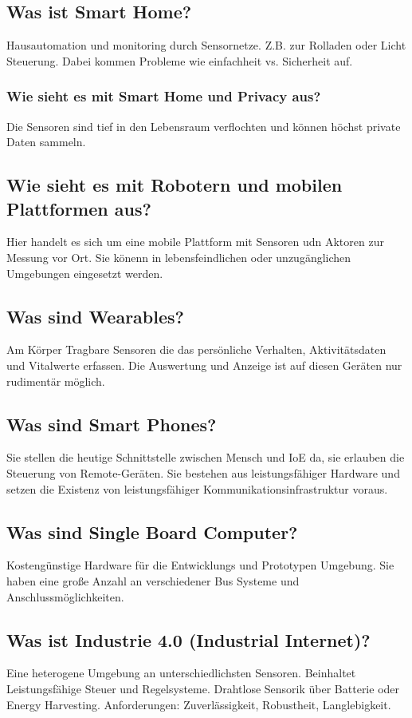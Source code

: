 	\subsection{Was ist Smart Home?}
	Hausautomation und monitoring durch Sensornetze. 
	Z.B. zur Rolladen oder Licht Steuerung.
	Dabei kommen Probleme wie einfachheit vs. Sicherheit auf. 
	\subsubsection{Wie sieht es mit Smart Home und Privacy aus?}
	Die Sensoren sind tief in den Lebensraum verflochten und können höchst private Daten sammeln.
	\subsection{Wie sieht es mit Robotern und mobilen Plattformen aus?}
	Hier handelt es sich um eine mobile Plattform mit Sensoren udn Aktoren zur Messung vor Ort.
	Sie könenn in lebensfeindlichen oder unzugänglichen Umgebungen eingesetzt werden.
	\subsection{Was sind Wearables?}
	Am Körper Tragbare Sensoren die das persönliche Verhalten, Aktivitätsdaten und Vitalwerte erfassen.
	Die Auswertung und Anzeige ist auf diesen Geräten nur rudimentär möglich.
	\subsection{Was sind Smart Phones?}
	Sie stellen die heutige Schnittstelle zwischen Mensch und IoE da, sie erlauben die Steuerung von Remote-Geräten.
	Sie bestehen aus leistungsfähiger Hardware und setzen die Existenz von leistungsfähiger Kommunikationsinfrastruktur voraus.
	\subsection{Was sind Single\- Board Computer?}
	Kostengünstige Hardware für die Entwicklungs und Prototypen Umgebung.
	Sie haben eine große Anzahl an verschiedener Bus Systeme und Anschlussmöglichkeiten.
	
	\subsection{Was ist Industrie 4.0 (Industrial Internet)?}
	Eine heterogene Umgebung an unterschiedlichsten Sensoren. Beinhaltet Leistungsfähige Steuer\- und Regelsysteme.
	Drahtlose Sensorik über Batterie oder Energy Harvesting.
	Anforderungen: Zuverlässigkeit, Robustheit, Langlebigkeit.
	
